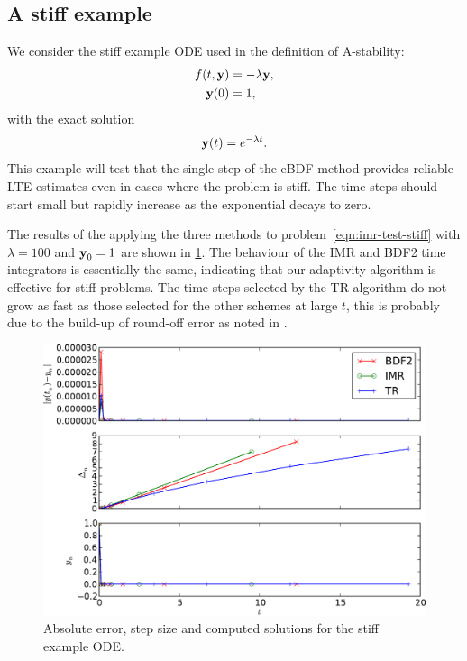 \subsection{A stiff example}
\label{sec:imr-stiff-example}

We consider the stiff example ODE used in the definition of A-stability:
\begin{equation}
  \label{eqn:imr-test-stiff}
  \begin{aligned}
    f(t, \boldsymbol{\mathrm{y}}) &= -\lambda \boldsymbol{\mathrm{y}}, \\
    \boldsymbol{\mathrm{y}}(0) &= 1,
  \end{aligned}
\end{equation}
with the exact solution
\begin{equation}
  \label{eqn:imr-test-stiff-exact}
  \boldsymbol{\mathrm{y}}(t) = e^{-\lambda t}.
\end{equation}
This example will test that the single step of the eBDF method provides reliable LTE estimates even in cases where the problem is stiff.
The time steps should start small but rapidly increase as the exponential decays to zero.

The results of the applying the three methods to problem~\cref{eqn:imr-test-stiff} with $\lambda = 100$ and $\boldsymbol{\mathrm{y}}_0 = 1$ are shown in \cref{fig:imr-stiff-example}.
The behaviour of the IMR and BDF2 time integrators is essentially the same, indicating that our adaptivity algorithm is effective for stiff problems.
The time steps selected by the TR algorithm do not grow as fast as those selected for the other schemes at large $t$, this is probably due to the build-up of round-off error as noted in \eg \cite{Gresho2008}.

\begin{figure}
  \centering
  \includegraphics[width=1\textwidth]{plots/aimr_odes_traces/simple_stiff-errornormsvs-dtsvs-tracevaluesvstimes}
  \caption{Absolute error, step size and computed solutions for the stiff example ODE.}
  \label{fig:imr-stiff-example}
\end{figure}


